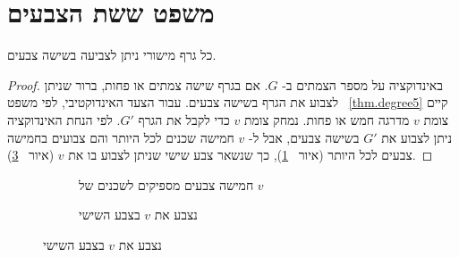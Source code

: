 \section{משפט ששת הצבעים}\label{s.six-color}

\begin{theorem}\label{thm.sixcolor}
כל גרף מישורי ניתן לצביעה בשישה צבעים.
\end{theorem}

\begin{proof}
באינדוקציה על מספר הצמתים ב-%
$G$.
אם בגרף שישה צמתים או פחות, ברור שניתן לצבוע את הגרף בשישה צבעים. עבור הצעד האינדוקטיבי, לפי משפט
~\ref{thm.degree5}
קיים צומת
$v$
מדרגה חמש או פחות. נמחק צומת
$v$
כדי לקבל את הגרף
$G'$.
לפי הנחת האינדוקציה ניתן לצבוע את
$G'$
בשישה צבעים, אבל ל-%
$v$
חמישה שכנים לכל היותר והם צבועים בחמישה צבעים לכל היותר
(איור~%
\ref{f.five-six-five}),
כך שנשאר צבע שישי שניתן לצבוע בו את
$v$
(איור~%
\ref{f.five-six-six}).
\end{proof}

\begin{figure}[tb]
\begin{center}
\begin{subfigure}{.4\textwidth}\centering
{}
\caption{חמישה צבעים מספיקים לשכנים של
$v$}\label{f.five-six-five}
\end{subfigure}
\hspace{3em}
\begin{subfigure}{.4\textwidth}\centering
{}
\caption{נצבע את
$v$
בצבע השישי}
\label{f.five-six-six}
\end{subfigure}
\end{center}
\end{figure}

